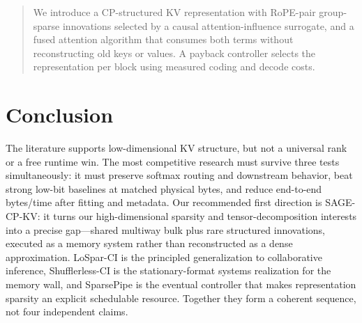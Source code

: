 \documentclass[10pt]{article}
\begin{document}
\begin{quote}
We introduce a CP-structured KV representation with RoPE-pair group-sparse innovations selected by
a causal attention-influence surrogate, and a fused attention algorithm that consumes both terms
without reconstructing old keys or values. A payback controller selects the representation per
block using measured coding and decode costs.
\end{quote}

\section{Conclusion}

The literature supports low-dimensional KV structure, but not a universal rank or a free runtime
win. The most competitive research must survive three tests simultaneously: it must preserve
softmax routing and downstream behavior, beat strong low-bit baselines at matched physical bytes,
and reduce end-to-end bytes/time after fitting and metadata. Our recommended first direction is
SAGE-CP-KV: it turns our high-dimensional sparsity and tensor-decomposition interests into a
precise gap---shared multiway bulk plus rare structured innovations, executed as a memory system
rather than reconstructed as a dense approximation. LoSpar-CI is the principled generalization to
collaborative inference, Shufflerless-CI is the stationary-format systems realization for the
memory wall, and SparsePipe is the eventual controller that makes representation sparsity an
explicit schedulable resource. Together they form a coherent sequence, not four independent
claims.
\end{document}
